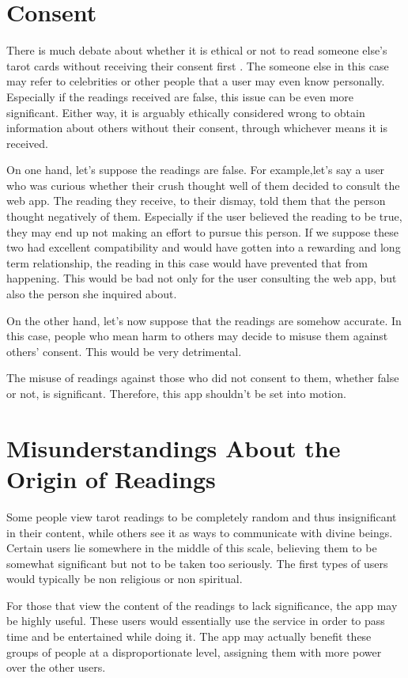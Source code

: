 \documentclass[10pt,twocolumn]{article}
\begin{document}
\section{Consent}
There is much debate about whether it is ethical or not to read someone else's tarot cards without receiving their consent first \cite{holly_2021}. The someone else in this case may refer to celebrities or other people that a user may even know personally. Especially if the readings received are false, this issue can be even more significant. Either way, it is arguably ethically considered wrong to obtain information about others without their consent, through whichever means it is received. 

On one hand, let's suppose the readings are false. For example,let's say a user who was curious whether their crush thought well of them decided to consult the web app. The reading they receive, to their dismay, told them that the person thought negatively of them. Especially if the user believed the reading to be true, they may end up not making an effort to pursue this person. If we suppose these two had excellent compatibility and would have gotten into a rewarding and long term relationship, the reading in this case would have prevented that from happening. This would be bad not only for the user consulting the web app, but also the person she inquired about.

On the other hand, let's now suppose that the readings are somehow accurate. In this case, people who mean harm to others may decide to misuse them against others' consent. This would be very detrimental. 

The misuse of readings against those who did not consent to them, whether false or not, is significant. Therefore, this app shouldn't be set into motion.

\section{Misunderstandings About the Origin of Readings}
Some people view tarot readings to be completely random and thus insignificant in their content, while others see it as ways to communicate with divine beings\cite{guru_2021}. Certain users lie somewhere in the middle of this scale, believing them to be somewhat significant but not to be taken too seriously. The first types of users would typically be non religious or non spiritual. 

For those that view the content of the readings to lack significance, the app may be highly useful. These users would essentially use the service in order to pass time and be entertained while doing it. The app may actually benefit these groups of people at a disproportionate level, assigning them with more power over the other users. 
\end{document}
